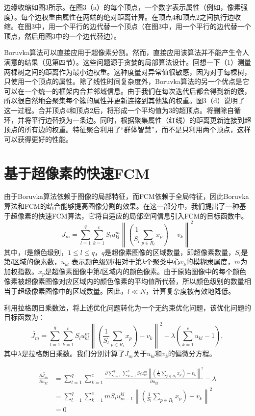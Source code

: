 边缘收缩如图3所示。在图3（a）的每个顶点，一个数字表示属性（例如，像素强度）。每个边权重由属性在两端的绝对距离计算。在顶点4和顶点2之间执行边收缩。在图3中，用一个平行的边代替一个顶点（在图3中，用一个平行的边代替一个顶点，然后用图3中的一个边代替边）。

Boruvka算法可以直接应用于超像素分割。然而，直接应用该算法并不能产生令人满意的结果（见第四节）。这些问题源于贪婪的局部算法设计。回想一下（1）测量两棵树之间的距离作为最小边权重。这种度量对异常值很敏感，因为对于每棵树，只使用一个顶点的属性。除了线性时间复杂度外，Boruvka算法的另一个优点是它可以在一个统一的框架内合并邻域信息。由于我们在每次迭代后都会得到新的簇，所以很自然地会聚集每个簇的属性并更新连接到其他簇的权重。图3（d）说明了这一过程。合并顶点4和顶点2后，将形成一个平均值为3的超顶点。将删除自循环，并将平行边替换为一条边。同时，根据聚集属性（红线）的距离更新连接到超顶点的所有边的权重。特征聚合利用了“群体智慧”，而不是只利用两个顶点，这样可以获得更好的性能。

\section{基于超像素的快速FCM}
由于Boruvka算法依赖于图像的局部特征，而FCM依赖于全局特征，因此Boruvka算法和FCM的结合能够提高图像分割的效果。在这一部分中，我们提出了一种基于超像素的快速FCM算法，它将自适应的局部空间信息引入FCM的目标函数中。
\begin{equation}
J_{m} = \sum_{l=1}^{q}\sum_{k=1}^{c}S_{l}u_{kl}^{m} \left \| (\frac{1}{S_{l}}\sum_{p\in R_{l}}x_{p})-v_{k} \right \|^{2}
\end{equation}
其中，$l$是颜色级别，$1\leq l\leq q$，$q$是超像素图像的区域数量，即超像素数量，$S_{l}$是第$l$区域的像素数，$u_{kl}$ 表示颜色级别$l$相对于第$k$个聚类中心$v_{k}$的模糊隶属度，$m$为加权指数。$x_{p}$是超像素图像中第$l$区域内的颜色像素。由于原始图像中的每个颜色像素被超像素图像对应区域内的颜色像素的平均值所代替，所以颜色级别的数量相当于超级像素图像中的区域数量。因此，$l\ll N$，计算复杂度被有效地降低。

利用拉格朗日乘数法，将上述优化问题转化为一个无约束优化问题，该优化问题的目标函数为：
\begin{equation}\label{eqn:sim}
\widetilde{J_{m}} = \sum_{l=1}^{q}\sum_{k=1}^{c}S_{l}u_{kl}^{m} \left \| (\frac{1}{S_{l}}\sum_{p\in R_{l}}x_{p})-v_{k} \right \|^{2} - \lambda (\sum_{k=1}^{c}u_{kl}-1),
\end{equation}
其中$\lambda$是拉格朗日乘数。我们分别计算了$\widetilde{J_{m}}$关于$u_{kl}$和$v_k$的偏微分方程。

\begin{equation}
\begin{split}
\frac{\partial \widetilde{J_m}}{\partial u_{kl}}
&= \sum_{l=1}^{q}\sum_{k=1}^{c}\frac{\partial \sum_{l=1}^{q}\sum_{k=1}^{c}S_{l}u_{kl}^{m} \left \| (\frac{1}{S_{l}}\sum_{p\in R_{l}}x_{p})-v_{k} \right \|^{2}}{\partial u_{kl}}-\lambda \\
&= \sum_{l=1}^{q}\sum_{k=1}^{c}mS_{l}u_{m-1}^{kl}\left \| (\frac{1}{S_{l}}\sum_{p\in R_{l}}x_{p})-v_{k}  \right \|^{2} \\
&= 0
\end{split}
\end{equation}

